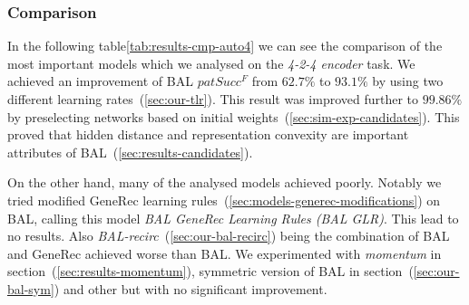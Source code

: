 
\subsubsection{Comparison} 
\label{sec:tlr-auto4-cmp} 

In the following table\ref{tab:results-cmp-auto4} we can see the comparison of the most important models which we analysed on the \emph{4-2-4 encoder} task. We achieved an improvement of BAL $patSucc^F$ from $62.7\%$ to $93.1\%$ by using two different learning rates~(\ref{sec:our-tlr}). This result was improved further to $99.86\%$ by preselecting networks based on initial weights~(\ref{sec:sim-exp-candidates}). This proved that hidden distance and representation convexity are important attributes of BAL~(\ref{sec:results-candidates}). 

On the other hand, many of the analysed models achieved poorly. Notably we tried modified GeneRec learning rules~(\ref{sec:models-generec-modifications}) on BAL, calling this model \emph{BAL GeneRec Learning Rules (BAL GLR)}. This lead to no results. Also \emph{BAL-recirc}~(\ref{sec:our-bal-recirc}) being the combination of BAL and GeneRec achieved worse than BAL. We experimented with \emph{momentum} in section~(\ref{sec:results-momentum}), symmetric version of BAL in section~(\ref{sec:our-bal-sym}) and other but with no significant improvement. 

